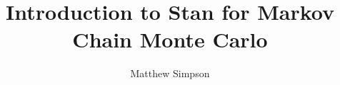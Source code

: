 \documentclass[xcolor=dvipsnames]{beamer}
\title[Stan for Spatial]{Introduction to Stan for Markov Chain Monte Carlo}
\author[Matt Simpson]{Matthew Simpson}
\institute[Mizzou Statistics]{Department of Statistics, University of Missouri}
\begin{document}
\begin{frame}
\titlepage
\end{frame}

\end{document}
